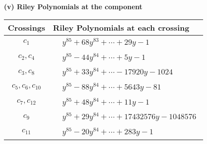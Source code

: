 \documentclass[1p]{elsarticle_modified}
\theoremstyle{definition}
\begin{document}
\newpage\renewcommand{\arraystretch}{1}
\flushleft \textbf{(v) Riley Polynomials at the component}\newline \\
\begin{tabular}{m{50pt}|m{274pt}}
Crossings & \hspace{64pt}Riley Polynomials at each crossing \\
\hline $$\begin{aligned}c_{1}\end{aligned}$$&$\begin{aligned}
&y^{85}+68 y^{83}+\cdots+29 y-1
\end{aligned}$\\
\hline $$\begin{aligned}c_{2},c_{4}\end{aligned}$$&$\begin{aligned}
&y^{85}-44 y^{84}+\cdots+5 y-1
\end{aligned}$\\
\hline $$\begin{aligned}c_{3},c_{8}\end{aligned}$$&$\begin{aligned}
&y^{85}+33 y^{84}+\cdots-17920 y-1024
\end{aligned}$\\
\hline $$\begin{aligned}c_{5},c_{6},c_{10}\end{aligned}$$&$\begin{aligned}
&y^{85}-88 y^{84}+\cdots+5643 y-81
\end{aligned}$\\
\hline $$\begin{aligned}c_{7},c_{12}\end{aligned}$$&$\begin{aligned}
&y^{85}+48 y^{84}+\cdots+11 y-1
\end{aligned}$\\
\hline $$\begin{aligned}c_{9}\end{aligned}$$&$\begin{aligned}
&y^{85}+29 y^{84}+\cdots+17432576 y-1048576
\end{aligned}$\\
\hline $$\begin{aligned}c_{11}\end{aligned}$$&$\begin{aligned}
&y^{85}-20 y^{84}+\cdots+283 y-1
\end{aligned}$\\
\hline
\end{tabular}\\~\\
\end{document}
